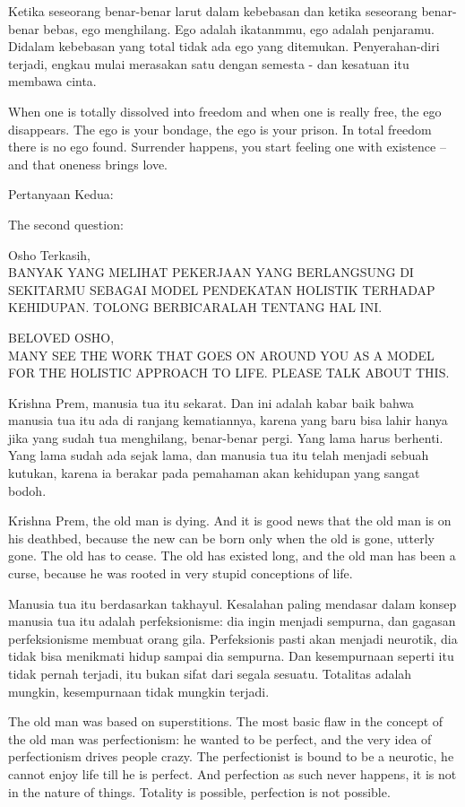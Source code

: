 \bahasa
Ketika seseorang benar-benar larut dalam kebebasan dan ketika seseorang benar-benar bebas, ego menghilang. Ego adalah ikatanmmu, ego adalah penjaramu. Didalam kebebasan yang total tidak ada ego yang ditemukan. Penyerahan-diri terjadi, engkau mulai merasakan satu dengan semesta - dan kesatuan itu membawa cinta.

\english
When one is totally dissolved into freedom and when one is really free, the ego disappears. The ego is your bondage, the ego is your prison. In total freedom there is no ego found. Surrender happens, you start feeling one with existence -- and that oneness brings love.

\bahasa
Pertanyaan Kedua:

\english
The second question:

\bahasa
Osho Terkasih,\\
BANYAK YANG MELIHAT PEKERJAAN YANG BERLANGSUNG DI SEKITARMU SEBAGAI MODEL PENDEKATAN HOLISTIK TERHADAP KEHIDUPAN. TOLONG BERBICARALAH TENTANG HAL INI.

\english
BELOVED OSHO,\\
MANY SEE THE WORK THAT GOES ON AROUND YOU AS A MODEL FOR THE HOLISTIC APPROACH TO LIFE. PLEASE TALK ABOUT THIS.

\bahasa
Krishna Prem, manusia tua itu sekarat. Dan ini adalah kabar baik bahwa manusia tua itu ada di ranjang kematiannya, karena yang baru bisa lahir hanya jika yang sudah tua menghilang, benar-benar pergi. Yang lama harus berhenti. Yang lama sudah ada sejak lama, dan manusia tua itu telah menjadi sebuah kutukan, karena ia berakar pada pemahaman akan kehidupan yang sangat bodoh.

\english
Krishna Prem, the old man is dying. And it is good news that the old man is on his deathbed, because the new can be born only when the old is gone, utterly gone. The old has to cease. The old has existed long, and the old man has been a curse, because he was rooted in very stupid conceptions of life.

\bahasa
Manusia tua itu berdasarkan takhayul. Kesalahan paling mendasar dalam konsep manusia tua itu adalah perfeksionisme: dia ingin menjadi sempurna, dan gagasan perfeksionisme membuat orang gila. Perfeksionis pasti akan menjadi neurotik, dia tidak bisa menikmati hidup sampai dia sempurna. Dan kesempurnaan seperti itu tidak pernah terjadi, itu bukan sifat dari segala sesuatu. Totalitas adalah mungkin, kesempurnaan tidak mungkin terjadi.

\english
The old man was based on superstitions. The most basic flaw in the concept of the old man was perfectionism: he wanted to be perfect, and the very idea of perfectionism drives people crazy. The perfectionist is bound to be a neurotic, he cannot enjoy life till he is perfect. And  perfection as such never happens, it is not in the nature of things. Totality is possible, perfection is not possible.

